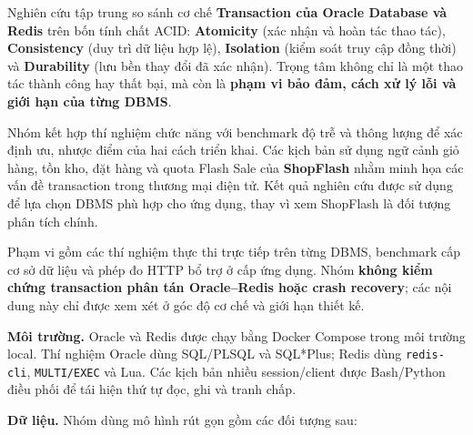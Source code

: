 \label{sec:tx-1}
\label{sec:tx-1-1}
Nghiên cứu tập trung so sánh cơ chế \textbf{Transaction của Oracle Database và Redis} trên bốn tính chất ACID: \textbf{Atomicity} (xác nhận và hoàn tác thao tác), \textbf{Consistency} (duy trì dữ liệu hợp lệ), \textbf{Isolation} (kiểm soát truy cập đồng thời) và \textbf{Durability} (lưu bền thay đổi đã xác nhận). Trọng tâm không chỉ là một thao tác thành công hay thất bại, mà còn là \textbf{phạm vi bảo đảm, cách xử lý lỗi và giới hạn của từng DBMS}.

Nhóm kết hợp thí nghiệm chức năng với benchmark độ trễ và thông lượng để xác định ưu, nhược điểm của hai cách triển khai. Các kịch bản sử dụng ngữ cảnh giỏ hàng, tồn kho, đặt hàng và quota Flash Sale của \textbf{ShopFlash} nhằm minh họa các vấn đề transaction trong thương mại điện tử. Kết quả nghiên cứu được sử dụng để lựa chọn DBMS phù hợp cho ứng dụng, thay vì xem ShopFlash là đối tượng phân tích chính.

Phạm vi gồm các thí nghiệm thực thi trực tiếp trên từng DBMS, benchmark cấp cơ sở dữ liệu và phép đo HTTP bổ trợ ở cấp ứng dụng. Nhóm \textbf{không kiểm chứng transaction phân tán Oracle–Redis hoặc crash recovery}; các nội dung này chỉ được xem xét ở góc độ cơ chế và giới hạn thiết kế.

\label{sec:tx-1-2}
\textbf{Môi trường.} Oracle và Redis được chạy bằng Docker Compose trong môi trường local. Thí nghiệm Oracle dùng SQL/PLSQL và SQL*Plus; Redis dùng \texttt{redis-\allowbreak{}cli}, \texttt{MULTI/\allowbreak{}EXEC} và Lua. Các kịch bản nhiều session/client được Bash/Python điều phối để tái hiện thứ tự đọc, ghi và tranh chấp.

\textbf{Dữ liệu.} Nhóm dùng mô hình rút gọn gồm các đối tượng sau:

